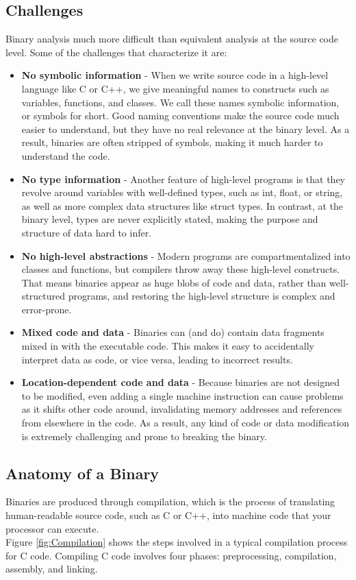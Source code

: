 \subsection{Challenges}
Binary analysis much more difficult than equivalent analysis at the source code level. Some of the challenges that characterize it are:

\begin{itemize}
    \item \textbf{No symbolic information} - When we write source code in a high-level language like C or C++, we give meaningful names to constructs such as variables, functions, and classes. We call these names symbolic information, or symbols for short. Good naming conventions make the source code much easier to understand, but they have no real relevance at the binary level. As a result, binaries are often stripped of symbols, making it much harder to understand the code.
    \item \textbf{No type information} - Another feature of high-level programs is that they revolve around variables with well-defined types, such as int, float, or string, as well as more complex data structures like struct types. In contrast, at the binary level, types are never explicitly stated, making the purpose and structure of data hard to infer.
    \item \textbf{No high-level abstractions} - Modern programs are compartmentalized into classes and functions, but compilers throw away these high-level constructs. That means binaries appear as huge blobs of code and data, rather than well-structured programs, and restoring the high-level structure is complex and error-prone.
    \item \textbf{Mixed code and data} - Binaries can (and do) contain data fragments mixed in with the executable code. This makes it easy to accidentally interpret data as code, or vice versa, leading to incorrect results.
    \item \textbf{Location-dependent code and data} - Because binaries are not designed to be modified, even adding a single machine instruction can cause problems as it shifts other code around, invalidating memory addresses and references from elsewhere in the code. As a result, any kind of code or data modification is extremely challenging and prone to breaking the binary.
\end{itemize}

\subsection{Anatomy of a Binary}
Binaries are produced through compilation, which is the process of translating human-readable source code, such as C or C++, into machine code that your processor can execute. \\
Figure \ref{fig:Compilation} shows the steps involved in a typical compilation process for C code. Compiling C code involves four phases: preprocessing, compilation, assembly, and linking.

